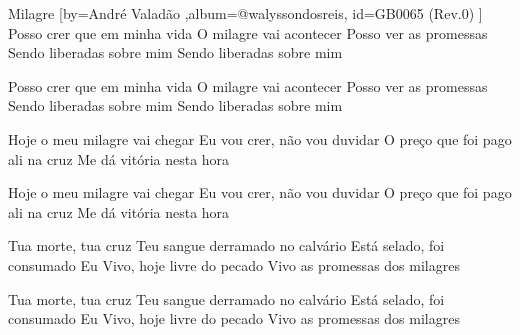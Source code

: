 \beginsong
{Milagre %
}[by={André Valadão %
},album={@walyssondosreis},
id={GB0065 %
(Rev.0) %
}]
Posso crer que em minha vida
O milagre vai acontecer
Posso ver as promessas
Sendo liberadas sobre mim
Sendo liberadas sobre mim

Posso crer que em minha vida
O milagre vai acontecer
Posso ver as promessas
Sendo liberadas sobre mim
Sendo liberadas sobre mim

Hoje o meu milagre vai chegar
Eu vou crer, não vou duvidar
O preço que foi pago ali na cruz
Me dá vitória nesta hora

Hoje o meu milagre vai chegar
Eu vou crer, não vou duvidar
O preço que foi pago ali na cruz
Me dá vitória nesta hora

Tua morte, tua cruz
Teu sangue derramado no calvário
Está selado, foi consumado
Eu Vivo, hoje livre do pecado
Vivo as promessas dos milagres

Tua morte, tua cruz
Teu sangue derramado no calvário
Está selado, foi consumado
Eu Vivo, hoje livre do pecado
Vivo as promessas dos milagres


